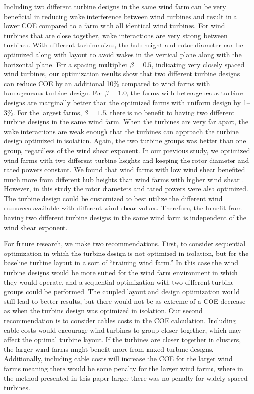 \documentclass[WESD, manuscript]{copernicus}
\begin{document}
Including two different turbine designs in the same wind farm can be very beneficial in reducing wake interference between wind turbines and result in a lower COE compared to a farm with all identical wind turbines. For wind turbines that are close together, wake interactions are very strong between turbines. With different turbine sizes, the hub height and rotor diameter can be optimized along with layout to avoid wakes in the vertical plane along with the horizontal plane. For a spacing multiplier $\beta=0.5$, indicating very closely spaced wind turbines, our optimization results show that two different turbine designs can reduce COE by an additional 10\% compared to wind farms with homogeneous turbine design. For $\beta=1.0$, the farms with heterogeneous turbine designs are marginally better than the optimized farms with uniform design by 1--3\%. For the largest farms, $\beta=1.5$, there is no benefit to having two different turbine designs in the same wind farm. When the turbines are very far apart, the wake interactions are weak enough that the turbines can approach the turbine design optimized in isolation.  Again, the two turbine groups was  better than one group, regardless of the wind shear exponent. In our previous study, we optimized wind farms with two different turbine heights and keeping the rotor diameter and rated powers constant. We found that wind farms with low wind shear benefited much more from different hub heights than wind farms with higher wind shear \citep{stanley2018}. However, in this study the rotor diameters and rated powers were also optimized. The turbine design could be customized to best utilize the different wind resources available with different wind shear values. Therefore, the benefit from having two different turbine designs in the same wind farm is independent of the wind shear exponent.

For future research, we make two recommendations. First, to consider sequential optimization in which the turbine design is not optimized in isolation, but for the baseline turbine layout in a sort of ``training wind farm.'' In this case the wind turbine designs would be more suited for the wind farm environment in which they would operate, and a sequential optimization with two different turbine groups could be performed. The coupled layout and design optimization would still lead to better results, but there would not be as extreme of a COE decrease as when the turbine design was optimized in isolation. Our second recommendation is to consider cables costs in the COE calculation. Including cable costs would encourage wind turbines to group closer together, which may affect the optimal turbine layout. If the turbines are closer together in clusters, the larger wind farms might benefit more from mixed turbine designs. Additionally, including cable costs will increase the COE for the larger wind farms meaning there would be some penalty for the larger wind farms, where in the method presented in this paper larger there was no penalty for widely spaced turbines.
\end{document}
